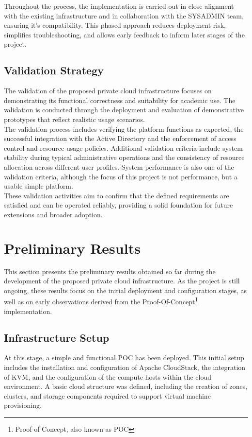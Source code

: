 \documentclass[sigplan]{acmart}
\begin{document}
        Throughout the process, the implementation is carried out in close alignment with the existing infrastructure and in collaboration with the SYSADMIN team, ensuring it's compatibility. This phased approach reduces deployment risk, simplifies troubleshooting, and allows early feedback to inform later stages of the project.
    
    \subsection{Validation Strategy}
        The validation of the proposed private cloud infrastructure focuses on demonstrating its functional correctness and suitability for academic use. The validation is conducted through the deployment and evaluation of demonstrative prototypes that reflect realistic usage scenarios.\\

        The validation process includes verifying the platform functions as expected, the successful integration with the Active Directory and the enforcement of access control and resource usage policies. Additional validation criteria include system stability during typical administrative operations and the consistency of resource allocation across different user profiles. System performance is also one of the validation criteria, although the focus of this project is not performance, but a usable simple platform.\\
        
        These validation activities aim to confirm that the defined requirements are satisfied and can be operated reliably, providing a solid foundation for future extensions and broader adoption.

\section{Preliminary Results} \label{sec:results}
    This section presents the preliminary results obtained so far during the development of the proposed private cloud infrastructure. As the project is still ongoing, these results focus on the initial deployment and configuration stages, as well as on early observations derived from the Proof-Of-Concept\footnote{Proof-of-Concept, also known as POC} implementation.

    \subsection{Infrastructure Setup}
        At this stage, a simple and functional POC has been deployed. This initial setup includes the installation and configuration of Apache CloudStack, the integration of KVM, and the configuration of the compute hosts within the cloud environment. A basic cloud structure was defined, including the creation of zones, clusters, and storage components required to support virtual machine provisioning.\\
\end{document}
